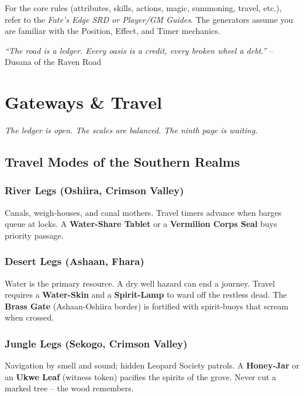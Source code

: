 \documentclass[12pt,oneside]{book}
\begin{document}
For the core rules (attributes, skills, actions, magic, summoning, travel, etc.), refer to the \textit{Fate's Edge SRD or Player/GM Guides}. The generators assume you are familiar with the Position, Effect, and Timer mechanics.

\vspace{1em}
\noindent\textit{``The road is a ledger. Every oasis is a credit, every broken wheel a debt.''} -- Dusana of the Raven Road

\mainmatter


\chapter{Gateways \& Travel}
\emph{The ledger is open. The scales are balanced. The ninth page is waiting.}

\section*{Travel Modes of the Southern Realms}

\subsection*{River Legs (Oshiira, Crimson Valley)}
Canals, weigh-houses, and canal mothers. Travel timers advance when barges queue at locks. A \textbf{Water-Share Tablet} or a \textbf{Vermilion Corps Seal} buys priority passage.

\subsection*{Desert Legs (Ashaan, Fhara)}
Water is the primary resource. A dry well hazard can end a journey. Travel requires a \textbf{Water-Skin} and a \textbf{Spirit-Lamp} to ward off the restless dead. The \textbf{Brass Gate} (Ashaan-Oshiira border) is fortified with spirit-buoys that scream when crossed.

\subsection*{Jungle Legs (Sekogo, Crimson Valley)}
Navigation by smell and sound; hidden Leopard Society patrols. A \textbf{Honey-Jar} or an \textbf{Ukwe Leaf} (witness token) pacifies the spirits of the grove. Never cut a marked tree -- the wood remembers.
\end{document}
